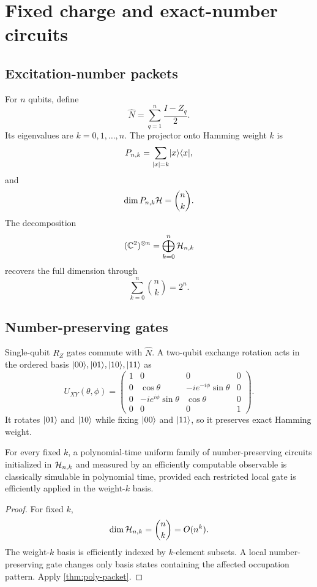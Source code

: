 \chapter{Fixed charge and exact-number circuits}
\label{ch:fixed-charge}

\section{Excitation-number packets}
For $n$ qubits, define
\[
\widehat N
=
\sum_{q=1}^n\frac{I-Z_q}{2}.
\]
Its eigenvalues are $k=0,1,\ldots,n$. The projector onto Hamming weight $k$ is
\[
P_{n,k}
=
\sum_{|x|=k}\lvert x\rangle\langle x\rvert,
\]
and
\[
\dim P_{n,k}\mathcal H
=
\binom nk.
\]
The decomposition
\[
(\mathbb C^2)^{\otimes n}
=
\bigoplus_{k=0}^n\mathcal H_{n,k}
\]
recovers the full dimension through
\[
\sum_{k=0}^n\binom nk=2^n.
\]

\section{Number-preserving gates}
Single-qubit $R_Z$ gates commute with $\widehat N$. A two-qubit exchange rotation acts in the ordered basis $\lvert 00\rangle,\lvert 01\rangle,\lvert 10\rangle,\lvert 11\rangle$ as
\[
U_{XY}(\theta,\phi)
=
\begin{pmatrix}
1&0&0&0\\
0&\cos\theta&-ie^{-i\phi}\sin\theta&0\\
0&-ie^{i\phi}\sin\theta&\cos\theta&0\\
0&0&0&1
\end{pmatrix}.
\]
It rotates $\lvert 01\rangle$ and $\lvert 10\rangle$ while fixing $\lvert 00\rangle$ and $\lvert 11\rangle$, so it preserves exact Hamming weight.

\begin{corollary}
\label{cor:fixed-charge-poly}
For every fixed $k$, a polynomial-time uniform family of number-preserving circuits initialized in $\mathcal H_{n,k}$ and measured by an efficiently computable observable is classically simulable in polynomial time, provided each restricted local gate is efficiently applied in the weight-$k$ basis.
\end{corollary}

\begin{proof}
For fixed $k$,
\[
\dim\mathcal H_{n,k}=\binom nk=O(n^k).
\]
The weight-$k$ basis is efficiently indexed by $k$-element subsets. A local number-preserving gate changes only basis states containing the affected occupation pattern. Apply \cref{thm:poly-packet}.
\end{proof}

